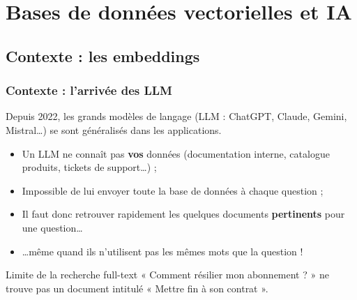 \section{Bases de données vectorielles et IA}

    \subsection{Contexte : les embeddings}
    \begin{frame}
        \frametitle{Contexte : l'arrivée des LLM}

        Depuis 2022, les grands modèles de langage (LLM : ChatGPT, Claude, Gemini, Mistral\dots) se sont généralisés dans les applications.

        \begin{itemize}
            \small
            \item Un LLM ne connaît pas \textbf{vos} données (documentation interne, catalogue produits, tickets de support\dots) ;
            \item Impossible de lui envoyer toute la base de données à chaque question ;
            \item Il faut donc retrouver rapidement les quelques documents \textbf{pertinents} pour une question\dots
            \item \dots même quand ils n'utilisent pas les mêmes mots que la question !
        \end{itemize}

        \begin{alertblock}{Limite de la recherche full-text}
            « Comment résilier mon abonnement ? » ne trouve pas un document intitulé « Mettre fin à son contrat ».
        \end{alertblock}
    \end{frame}

